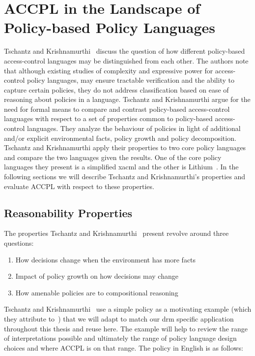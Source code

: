 \chapter{ACCPL in the Landscape of Policy-based Policy Languages}\label{chap:landscapechap}

Tschantz and Krishnamurthi~\cite{Tschantz} discuss the question of how different policy-based access-control languages may be distinguished from each other. The authors note that although existing studies of complexity and expressive power for access-control policy languages, may ensure tractable verification and the ability to capture certain policies, they do not address classification based on ease of reasoning about policies in a language. Tschantz and Krishnamurthi argue for the need for formal means to compare and contrast policy-based access-control languages with respect to a set of properties common to policy-based access-control languages. They analyze the behaviour of policies in light of additional and/or explicit environmental facts, policy growth and policy decomposition. Tschantz and Krishnamurthi apply their properties to two core policy languages and compare the two languages given the results. One of the core policy languages they present is a simplified \ac{xacml} and the other is Lithium~\cite{Halpern2008}. In the following sections we will describe Tschantz and Krishnamurthi's properties and evaluate \ac{ACCPL} with respect to these properties.

\section{Reasonability Properties}\label{sec:threeinterpretations}

The properties Tschantz and Krishnamurthi~\cite{Tschantz} present revolve around three questions:

\begin{enumerate}
\item How decisions change when the environment has more facts
\item Impact of policy growth on how decisions may change
\item How amenable policies are to compositional reasoning
\end{enumerate}

Tschantz and Krishnamurthi~\cite{Tschantz} use a simple policy as a motivating example (which they attribute to~\cite{Halpern2008}) that we will adapt to match our \ac{drm} specific application throughout this thesis and reuse here. The example will help to review the range of interpretations possible and ultimately the range of policy language design choices and where \ac{ACCPL} is on that range.
The policy in English is as follows:

